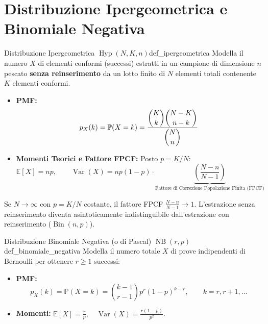 \section{Distribuzione Ipergeometrica e Binomiale Negativa}
\label{sec:ipergeometrica_binneg}

\begin{definizione}{Distribuzione Ipergeometrica $\operatorname{Hyp}(N, K, n)$}{def_ipergeometrica}
Modella il numero $X$ di elementi conformi (successi) estratti in un campione di dimensione $n$ pescato \textbf{senza reinserimento} da un lotto finito di $N$ elementi totali contenente $K$ elementi conformi.
\begin{itemize}
    \item \textbf{PMF:}
    \begin{equation}
        p_X(k) = \mathbb{P}(X = k) = \frac{\dbinom{K}{k}\dbinom{N-K}{n-k}}{\dbinom{N}{n}}
    \end{equation}
    \item \textbf{Momenti Teorici e Fattore FPCF:} Posto $p = K/N$:
    \begin{equation}
        \mathbb{E}[X] = n p, \qquad \operatorname{Var}(X) = n p (1-p) \cdot \underbrace{\left(\frac{N - n}{N - 1}\right)}_{\text{Fattore di Correzione Popolazione Finita (FPCF)}}
    \end{equation}
\end{itemize}
\end{definizione}

\begin{osservazione}
Se $N \to \infty$ con $p = K/N$ costante, il fattore FPCF $\frac{N-n}{N-1} \to 1$. L'estrazione senza reinserimento diventa asintoticamente indistinguibile dall'estrazione con reinserimento ($\operatorname{Bin}(n, p)$).
\end{osservazione}

\begin{definizione}{Distribuzione Binomiale Negativa (o di Pascal) $\operatorname{NB}(r, p)$}{def_binomiale_negativa}
Modella il numero totale $X$ di prove indipendenti di Bernoulli per ottenere $r \ge 1$ successi:
\begin{itemize}
    \item \textbf{PMF:}
    \begin{equation}
        p_X(k) = \mathbb{P}(X = k) = \binom{k-1}{r-1} p^r (1-p)^{k-r}, \qquad k = r, r+1, \dots
    \end{equation}
    \item \textbf{Momenti:} $\mathbb{E}[X] = \frac{r}{p}, \quad \operatorname{Var}(X) = \frac{r(1-p)}{p^2}$.
\end{itemize}
\end{definizione}

